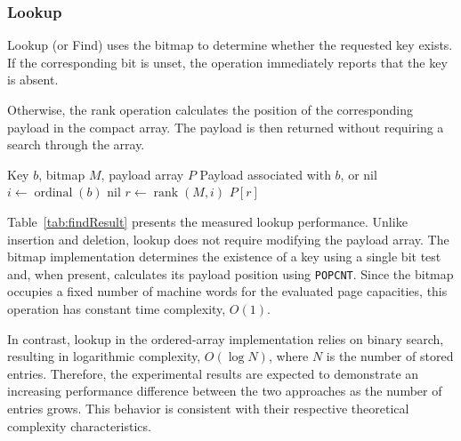 \documentclass[11pt,twoside]{article}
\begin{document}
    \subsubsection{Lookup}

    Lookup (or Find) uses the bitmap to determine whether the requested
    key exists. If the corresponding bit is unset, the operation
    immediately reports that the key is absent.

    Otherwise, the rank operation calculates the position of the
    corresponding payload in the compact array. The payload is then
    returned without requiring a search through the array.

    \begin{algorithm}
        \caption{Find in bitmap-array}
        \label{alg:bitmap-find}
        \begin{algorithmic}[1]
\Require Key $b$, bitmap $M$, payload array $P$
\Ensure Payload associated with $b$, or nil
\State $i \gets \operatorname{ordinal}(b)$
    \State \Return nil
\EndIf
\State $r \gets \operatorname{rank}(M,i)$
\State \Return $P[r]$
        \end{algorithmic}
    \end{algorithm}


    Table~\ref{tab:findResult} presents the measured lookup performance. Unlike insertion and deletion,
    lookup does not require modifying the payload array. The bitmap implementation determines the
    existence of a key using a single bit test and, when present, calculates its payload position
    using \texttt{POPCNT}. Since the bitmap occupies a fixed number of machine words for the evaluated page
    capacities, this operation has constant time complexity, $O(1)$.

    In contrast, lookup in the ordered-array implementation relies on binary search, resulting in
    logarithmic complexity, $O(\log N)$, where $N$ is the number of stored entries. Therefore,
    the experimental results are expected to demonstrate an increasing performance difference
    between the two approaches as the number of entries grows. This behavior is consistent with
    their respective theoretical complexity characteristics.
\end{document}

